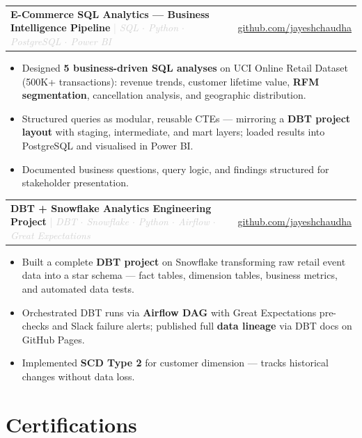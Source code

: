 \documentclass[10pt, a4paper]{article}
\makeatletter
\newcommand{\projectentry}[3]{%
    \noindent
    \begin{tabularx}{\linewidth}{@{}X r@{}}
        {\bfseries\color{darkgray} #1}
        \textcolor{lightgray}{\small | \textit{#2}}
        & \textcolor{accent}{\small\faGithub\
          \href{#3}{github.com/jayeshchaudha}} \\
    \end{tabularx}\vspace{2pt}
}
\makeatother
\begin{document}
\vspace{2pt}

\projectentry{E-Commerce SQL Analytics --- Business Intelligence Pipeline}%
    {SQL $\cdot$ Python $\cdot$ PostgreSQL $\cdot$ Power BI}%
    {https://github.com/jayeshchaudha/E-commerce-SQL-Analysis}

\begin{itemize}
    \item Designed \textbf{5 business-driven SQL analyses} on UCI Online Retail Dataset
    (500K+ transactions): revenue trends, customer lifetime value, \textbf{RFM segmentation},
    cancellation analysis, and geographic distribution.
    \item Structured queries as modular, reusable CTEs --- mirroring a \textbf{DBT project
    layout} with staging, intermediate, and mart layers; loaded results into PostgreSQL and
    visualised in Power BI.
    \item Documented business questions, query logic, and findings structured for
    stakeholder presentation.
\end{itemize}

\vspace{2pt}

\projectentry{DBT + Snowflake Analytics Engineering Project}%
    {DBT $\cdot$ Snowflake $\cdot$ Python $\cdot$ Airflow $\cdot$ Great Expectations}%
    {https://github.com/jayeshchaudha/dbt-snowflake-analytics}

\begin{itemize}
    \item Built a complete \textbf{DBT project} on Snowflake transforming raw retail event
    data into a star schema --- fact tables, dimension tables, business metrics, and
    automated data tests.
    \item Orchestrated DBT runs via \textbf{Airflow DAG} with Great Expectations pre-checks
    and Slack failure alerts; published full \textbf{data lineage} via DBT docs on GitHub Pages.
    \item Implemented \textbf{SCD Type 2} for customer dimension --- tracks historical changes
    without data loss.
\end{itemize}

\section{Certifications}
\end{document}
